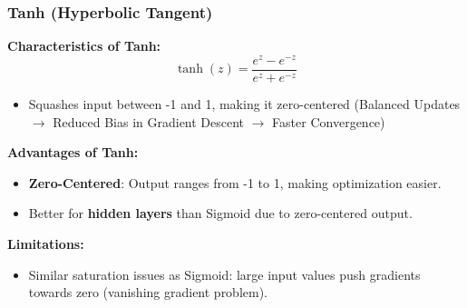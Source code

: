 \documentclass[serif, aspectratio=169]{beamer}
\begin{document}
\begin{frame}
    \frametitle{Tanh (Hyperbolic Tangent)}

    \textbf{Characteristics of Tanh:}
    \begin{equation*}
        \tanh(z) = \frac{e^z - e^{-z}}{e^z + e^{-z}}
    \end{equation*}
    \begin{itemize}
        \item Squashes input between -1 and 1, making it zero-centered (Balanced Updates $\rightarrow$ Reduced Bias in Gradient Descent $\rightarrow$ Faster Convergence)
    \end{itemize}

    \textbf{Advantages of Tanh:}
    \begin{itemize}
        \item \textbf{Zero-Centered}: Output ranges from -1 to 1, making optimization easier.
        \item Better for \textbf{hidden layers} than Sigmoid due to zero-centered output.
    \end{itemize}

    \textbf{Limitations:}
    \begin{itemize}
        \item Similar saturation issues as Sigmoid: large input values push gradients towards zero (vanishing gradient problem).
    \end{itemize}

\end{frame}
\end{document}
